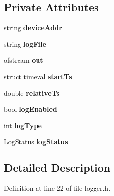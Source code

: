\subsection*{Private Attributes}
\begin{DoxyCompactItemize}
\item 
\hypertarget{class_logger_a73099a7a544561b915ce5d2ded948f21}{string {\bfseries device\-Addr}}\label{class_logger_a73099a7a544561b915ce5d2ded948f21}

\item 
\hypertarget{class_logger_a8b200289dbdecb5185f2ac0bb4c1b99e}{string {\bfseries log\-File}}\label{class_logger_a8b200289dbdecb5185f2ac0bb4c1b99e}

\item 
\hypertarget{class_logger_ae902fa4a195223c0b746972ee46ca9aa}{ofstream {\bfseries out}}\label{class_logger_ae902fa4a195223c0b746972ee46ca9aa}

\item 
\hypertarget{class_logger_a28e321ba8244aa0f18433f8088502512}{struct timeval {\bfseries start\-Ts}}\label{class_logger_a28e321ba8244aa0f18433f8088502512}

\item 
\hypertarget{class_logger_ae8f07f0a62335b17156f72e0345adf82}{double {\bfseries relative\-Ts}}\label{class_logger_ae8f07f0a62335b17156f72e0345adf82}

\item 
\hypertarget{class_logger_a9fa4816586d6587deeebb2a090122273}{bool {\bfseries log\-Enabled}}\label{class_logger_a9fa4816586d6587deeebb2a090122273}

\item 
\hypertarget{class_logger_a1f167002b52baf4d1fdd4c996524ee84}{int {\bfseries log\-Type}}\label{class_logger_a1f167002b52baf4d1fdd4c996524ee84}

\item 
\hypertarget{class_logger_a7d49d3a9adc13ffb45bce2251a1afe53}{Log\-Status {\bfseries log\-Status}}\label{class_logger_a7d49d3a9adc13ffb45bce2251a1afe53}

\end{DoxyCompactItemize}


\subsection{Detailed Description}


Definition at line 22 of file logger.\-h.



